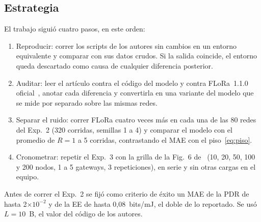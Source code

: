 \documentclass[conference,a4paper]{IEEEtran}
\begin{document}
\subsection{Estrategia}

El trabajo siguió cuatro pasos, en este orden:
\begin{enumerate}
\item Reproducir: correr los scripts de los autores sin cambios en un entorno equivalente y comparar con sus datos crudos. Si la salida coincide, el entorno queda descartado como causa de cualquier diferencia posterior.
\item Auditar: leer el artículo contra el código del modelo y contra FLoRa~1.1.0 oficial~\cite{repoflora}, anotar cada diferencia y convertirla en una variante del modelo que se mide por separado sobre las mismas redes.
\item Separar el ruido: correr FLoRa cuatro veces más en cada una de las 80 redes del Exp.~2 (320 corridas, semillas 1 a 4) y comparar el modelo con el promedio de $R=1$ a 5 corridas, contrastando el MAE con el piso~\eqref{eq:piso}.
\item Cronometrar: repetir el Exp.~3 con la grilla de la Fig.~6 de~\cite{fastlora} (10, 20, 50, 100 y 200 nodos, 1 a 5 gateways, 3 repeticiones), en serie y sin otras cargas en el equipo.
\end{enumerate}
Antes de correr el Exp.~2 se fijó como criterio de éxito un MAE de la PDR de hasta 2$\times10^{-2}$ y de la EE de hasta 0,08~bits/mJ, el doble de lo reportado. Se usó $L=10$~B, el valor del código de los autores.
\end{document}
